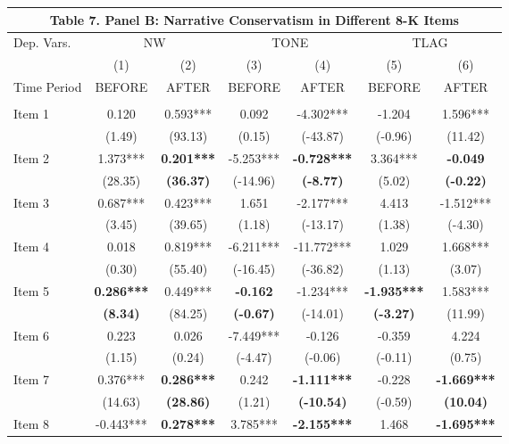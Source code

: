 \begin{table}[H] \label{T7PB}
  \centering
    \begin{tabular}{lcccccc}
    \multicolumn{7}{c}{\textbf{Table 7. Panel B: Narrative Conservatism in Different 8-K Items}} \\
    \midrule
    \midrule
    Dep. Vars. & \multicolumn{2}{c}{NW} & \multicolumn{2}{c}{TONE} & \multicolumn{2}{c}{TLAG} \\
    \cmidrule{2-7}
    & (1) & (2) & (3) & (4) & (5) & (6) \\
    Time Period & BEFORE & AFTER & BEFORE & AFTER & BEFORE & AFTER \\
    \midrule
      &   &   &   &   &   &  \\
    Item 1 & 0.120 & 0.593*** & 0.092 & -4.302*** & -1.204 & 1.596*** \\
      & (1.49) & (93.13) & (0.15) & (-43.87) & (-0.96) & (11.42) \\
    Item 2 & 1.373*** & \textbf{0.201***} & -5.253*** & \textbf{-0.728***} & 3.364*** & \textbf{-0.049} \\
      & (28.35) & \textbf{(36.37)} & (-14.96) & \textbf{(-8.77)} & (5.02) & \textbf{(-0.22)} \\
    Item 3 & 0.687*** & 0.423*** & 1.651 & -2.177*** & 4.413 & -1.512*** \\
      & (3.45) & (39.65) & (1.18) & (-13.17) & (1.38) & (-4.30) \\
    Item 4 & 0.018 & 0.819*** & -6.211*** & -11.772*** & 1.029 & 1.668*** \\
      & (0.30) & (55.40) & (-16.45) & (-36.82) & (1.13) & (3.07) \\
    Item 5 & \textbf{0.286***} & 0.449*** & \textbf{-0.162} & -1.234*** & \textbf{-1.935***} & 1.583*** \\
      & \textbf{(8.34)} & (84.25) & \textbf{(-0.67)} & (-14.01) & \textbf{(-3.27)} & (11.99) \\
    Item 6 & 0.223 & 0.026 & -7.449*** & -0.126 & -0.359 & 4.224 \\
      & (1.15) & (0.24) & (-4.47) & (-0.06) & (-0.11) & (0.75) \\
    Item 7 & 0.376*** & \textbf{0.286***} & 0.242 & \textbf{-1.111***} & -0.228 & \textbf{-1.669***} \\
      & (14.63) & \textbf{(28.86)} & (1.21) & \textbf{(-10.54)} & (-0.59) & \textbf{(10.04)} \\
    Item 8 & -0.443*** & \textbf{0.278***} & 3.785*** & \textbf{-2.155***} & 1.468 & \textbf{-1.695***} \\

\end{tabular}
\end{table}
